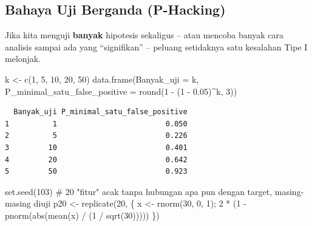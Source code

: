 \documentclass[
  indonesian,
  letterpaper,
]{book}
\newenvironment{Shaded}{\begin{snugshade}}{\end{snugshade}}
\newcommand{\AttributeTok}[1]{\textcolor[rgb]{0.40,0.45,0.13}{#1}}
\newcommand{\CommentTok}[1]{\textcolor[rgb]{0.37,0.37,0.37}{#1}}
\newcommand{\DecValTok}[1]{\textcolor[rgb]{0.68,0.00,0.00}{#1}}
\newcommand{\FloatTok}[1]{\textcolor[rgb]{0.68,0.00,0.00}{#1}}
\newcommand{\FunctionTok}[1]{\textcolor[rgb]{0.28,0.35,0.67}{#1}}
\newcommand{\NormalTok}[1]{\textcolor[rgb]{0.00,0.23,0.31}{#1}}
\newcommand{\OtherTok}[1]{\textcolor[rgb]{0.00,0.23,0.31}{#1}}
\newcommand{\SpecialCharTok}[1]{\textcolor[rgb]{0.37,0.37,0.37}{#1}}
\begin{document}
\subsection{Bahaya Uji Berganda
(P-Hacking)}\label{bahaya-uji-berganda-p-hacking}

Jika kita menguji \textbf{banyak} hipotesis sekaligus -- atau mencoba
banyak cara analisis sampai ada yang ``signifikan'' -- peluang
setidaknya satu kesalahan Tipe I melonjak.

\begin{Shaded}
\begin{Highlighting}[]
\NormalTok{k }\OtherTok{\textless{}{-}} \FunctionTok{c}\NormalTok{(}\DecValTok{1}\NormalTok{, }\DecValTok{5}\NormalTok{, }\DecValTok{10}\NormalTok{, }\DecValTok{20}\NormalTok{, }\DecValTok{50}\NormalTok{)}
\FunctionTok{data.frame}\NormalTok{(}\AttributeTok{Banyak\_uji =}\NormalTok{ k, }\AttributeTok{P\_minimal\_satu\_false\_positive =} \FunctionTok{round}\NormalTok{(}\DecValTok{1} \SpecialCharTok{{-}}\NormalTok{ (}\DecValTok{1} \SpecialCharTok{{-}} \FloatTok{0.05}\NormalTok{)}\SpecialCharTok{\^{}}\NormalTok{k,}
\DecValTok{3}\NormalTok{))}
\end{Highlighting}
\end{Shaded}

\begin{verbatim}
  Banyak_uji P_minimal_satu_false_positive
1          1                         0.050
2          5                         0.226
3         10                         0.401
4         20                         0.642
5         50                         0.923
\end{verbatim}

\begin{Shaded}
\begin{Highlighting}[]
\FunctionTok{set.seed}\NormalTok{(}\DecValTok{103}\NormalTok{)}
\CommentTok{\# 20 "fitur" acak tanpa hubungan apa pun dengan target, masing{-}masing diuji}
\NormalTok{p20 }\OtherTok{\textless{}{-}} \FunctionTok{replicate}\NormalTok{(}\DecValTok{20}\NormalTok{, \{ x }\OtherTok{\textless{}{-}} \FunctionTok{rnorm}\NormalTok{(}\DecValTok{30}\NormalTok{, }\DecValTok{0}\NormalTok{, }\DecValTok{1}\NormalTok{); }\DecValTok{2} \SpecialCharTok{*}\NormalTok{ (}\DecValTok{1} \SpecialCharTok{{-}} \FunctionTok{pnorm}\NormalTok{(}\FunctionTok{abs}\NormalTok{(}\FunctionTok{mean}\NormalTok{(x) }\SpecialCharTok{/}\NormalTok{ (}\DecValTok{1} \SpecialCharTok{/}
\FunctionTok{sqrt}\NormalTok{(}\DecValTok{30}\NormalTok{))))) \})}
\end{Highlighting}
\end{Shaded}
\end{document}
